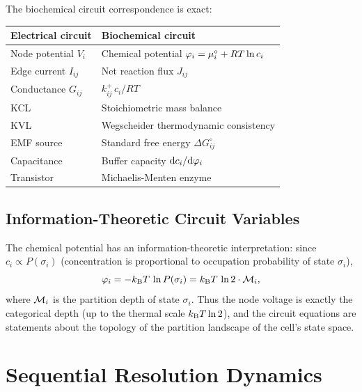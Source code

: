 \begin{remark}
The biochemical circuit correspondence is exact:
\begin{center}
\begin{tabular}{ll}
\toprule
\textbf{Electrical circuit} & \textbf{Biochemical circuit} \\
\midrule
Node potential $V_i$ & Chemical potential $\varphi_i = \mu_i^{\circ} + RT\ln c_i$ \\
Edge current $I_{ij}$ & Net reaction flux $J_{ij}$ \\
Conductance $G_{ij}$ & $k_{ij}^{+}\,c_i / RT$ \\
KCL & Stoichiometric mass balance \\
KVL & Wegscheider thermodynamic consistency \\
EMF source & Standard free energy $\Delta G_{ij}^{\circ}$ \\
Capacitance & Buffer capacity $\mathrm{d}c_i/\mathrm{d}\varphi_i$ \\
Transistor & Michaelis-Menten enzyme \\
\bottomrule
\end{tabular}
\end{center}
\end{remark}

\subsection{Information-Theoretic Circuit Variables}

The chemical potential has an information-theoretic interpretation: since
$c_i \propto P(\sigma_i)$ (concentration is proportional to occupation
probability of state $\sigma_i$),
\begin{equation}
  \varphi_i
  = -k_{\mathrm{B}} T\,\ln P(\sigma_i)
  = k_{\mathrm{B}} T\,\ln 2 \cdot \mathcal{M}_i,
  \label{eq:info-potential}
\end{equation}
where $\mathcal{M}_i$ is the partition depth of state $\sigma_i$.  Thus the
node voltage is exactly the categorical depth (up to the thermal scale
$k_{\mathrm{B}} T\ln 2$), and the circuit equations are statements about the topology
of the partition landscape of the cell's state space.

\section{Sequential Resolution Dynamics}
\label{sec:sequential-dynamics}

